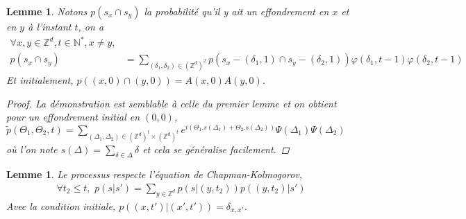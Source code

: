 \documentclass{article}
\newtheorem{lemma}[theorem]{Lemme}
\theoremstyle{definition}
\begin{document}
\begin{lemma}
	Notons $p(s_x\cap s_y)$ la probabilité qu'il y ait un effondrement en $x$ et en $y$ à l'instant $t$, on a
\begin{align*}
	\forall x, y\in \mathbb{Z}^d, t\in\mathbb{N}^*, x\neq y, \\p(s_x \cap s_y) &= \sum_{(\delta_1,\delta_2)\in (\mathbb{Z}^d)^2} p(s_x-(\delta_1, 1) \cap s_y-(\delta_2,1))\varphi(\delta_1,t-1)\varphi(\delta_2,t-1)\label{1}\tag{1}
\end{align*} 
Et initialement, $p((x,0)\cap (y,0)) = A(x,0)A(y,0)$. \begin{proof}
	La démonstration est semblable à celle du premier lemme et on obtient pour un effondrement initial en $(0,0)$, $\tilde{p}(\Theta_1, \Theta_2, t)=\sum_{(\Delta_1,\Delta_2)\in (\mathbb{Z}^d)^t\times(\mathbb{Z}^d)^t} e^{i(\Theta_1.s(\Delta_1)+\Theta_2.s(\Delta_2))} \Psi(\Delta_1)\Psi(\Delta_2)$ où l'on note $s(\Delta) = \sum_{\delta\in \Delta}\delta$ et cela se généralise facilement.
\end{proof}
\end{lemma}

\begin{lemma}
	Le processus respecte l'équation de Chapman-Kolmogorov, 
\begin{align*}
\forall t_2\leq t, \,\,p(s|s') = \sum_{y\in\mathbb{Z}^d}p(s|(y,t_2))p((y,t_2)|s')\end{align*}
Avec la condition initiale, $p((x,t')|(x',t')) = \delta_{x, x'}$.
\end{lemma}
\end{document}
